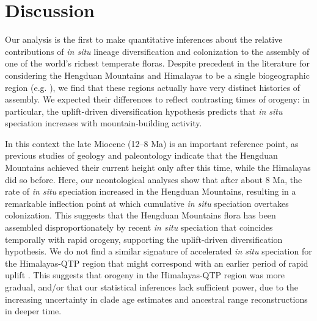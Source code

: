 \section{Discussion}

Our analysis is the first to make quantitative inferences about the relative contributions of \textit{in situ} lineage diversification and colonization to the assembly of one of the world's richest temperate floras. Despite precedent in the literature for considering the Hengduan Mountains and Himalayas to be a single biogeographic region (e.g. \citealt{Zhang2014,Nie2013,GaoY2013,Matuszak2016}), we find that these regions actually have very distinct histories of assembly. We expected their differences to reflect contrasting times of orogeny: in particular, the uplift-driven diversification hypothesis predicts that \textit{in situ} speciation increases with mountain-building activity.

In this context the late Miocene (12--8 Ma) is an important reference point, as previous studies of geology and paleontology indicate that the Hengduan Mountains achieved their current height only after this time, while the Himalayas did so before. Here, our neontological analyses show that after about 8 Ma, the rate of \textit{in situ} speciation increased in the Hengduan Mountains, resulting in a remarkable inflection point at which cumulative \textit{in situ} speciation overtakes colonization. This suggests that the Hengduan Mountains flora has been assembled disproportionately by recent \textit{in situ} speciation that coincides temporally with rapid orogeny, supporting the uplift-driven diversification hypothesis. We do not find a similar signature of accelerated \textit{in situ} speciation for the Himalayas-QTP region that might correspond with an earlier period of rapid uplift \citep{WangY2007,Mao2010}. This suggests that orogeny in the Himalayas-QTP region was more gradual, and/or that our statistical inferences lack sufficient power, due to the increasing uncertainty in clade age estimates and ancestral range reconstructions in deeper time. 


